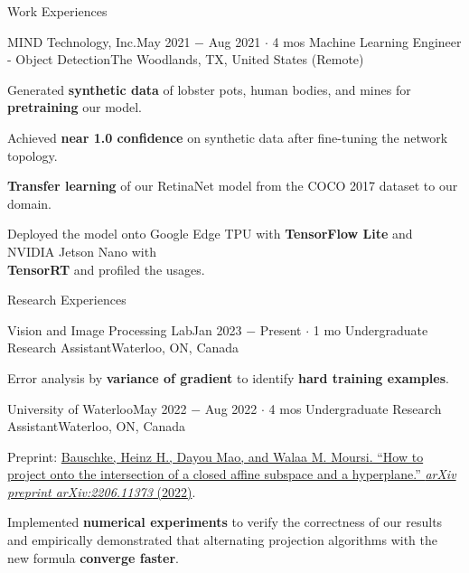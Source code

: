 \documentclass{resume}
\begin{document}
\begin{rSection}{Work Experiences}
    \begin{rSubsection}{MIND Technology, Inc.}{May 2021 \(-\) Aug 2021 \(\cdot\) 4 mos}
        {Machine Learning Engineer - Object Detection}{The Woodlands, TX, United States (Remote)}
        \item Generated \textbf{synthetic data} of lobster pots, human bodies, and mines for \textbf{pretraining} our model.
        \item Achieved \textbf{near 1.0 confidence} on synthetic data after fine-tuning the network topology.
        \item \textbf{Transfer learning} of our RetinaNet model from the COCO 2017 dataset to our domain.
        \item Deployed the model onto Google Edge TPU with \textbf{TensorFlow Lite} and NVIDIA Jetson Nano with\\
        \textbf{TensorRT} and profiled the usages.
    \end{rSubsection}

\end{rSection}

\begin{rSection}{Research Experiences}

    \begin{rSubsection}{Vision and Image Processing Lab}{Jan 2023 \(-\) Present \(\cdot\) 1 mo}
        {Undergraduate Research Assistant}{Waterloo, ON, Canada}
        \item Error analysis by \textbf{variance of gradient} to identify \textbf{hard training examples}.
    \end{rSubsection}

    \begin{rSubsection}{University of Waterloo}{May 2022 \(-\) Aug 2022 \(\cdot\) 4 mos}
        {Undergraduate Research Assistant}{Waterloo, ON, Canada}
        \item Preprint: \href{https://arxiv.org/abs/2206.11373}
        {Bauschke, Heinz H., Dayou Mao, and Walaa M. Moursi. ``How to project onto the intersection of a closed affine subspace and a hyperplane.'' \textit{arXiv preprint arXiv:2206.11373} (2022)}.
        \item Implemented \textbf{numerical experiments} to verify the correctness of our results
        and empirically demonstrated that alternating projection algorithms with the new formula \textbf{converge faster}.
    \end{rSubsection}

\end{rSection}
\end{document}

